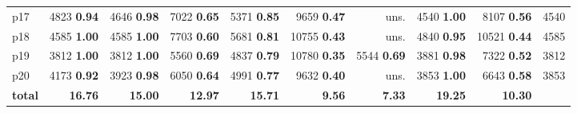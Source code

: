 \begin{tabular}{|l|rrrrrrrr|r|}
p17 & {\footnotesize 4823} \textbf{0.94} & {\footnotesize 4646} \textbf{0.98} & {\footnotesize 7022} \textbf{0.65} & {\footnotesize 5371} \textbf{0.85} & {\footnotesize 9659} \textbf{0.47} & uns. & {\footnotesize 4540} \textbf{1.00} & {\footnotesize 8107} \textbf{0.56} & 4540\\
p18 & {\footnotesize 4585} \textbf{1.00} & {\footnotesize 4585} \textbf{1.00} & {\footnotesize 7703} \textbf{0.60} & {\footnotesize 5681} \textbf{0.81} & {\footnotesize 10755} \textbf{0.43} & uns. & {\footnotesize 4840} \textbf{0.95} & {\footnotesize 10521} \textbf{0.44} & 4585\\
p19 & {\footnotesize 3812} \textbf{1.00} & {\footnotesize 3812} \textbf{1.00} & {\footnotesize 5560} \textbf{0.69} & {\footnotesize 4837} \textbf{0.79} & {\footnotesize 10780} \textbf{0.35} & {\footnotesize 5544} \textbf{0.69} & {\footnotesize 3881} \textbf{0.98} & {\footnotesize 7322} \textbf{0.52} & 3812\\
p20 & {\footnotesize 4173} \textbf{0.92} & {\footnotesize 3923} \textbf{0.98} & {\footnotesize 6050} \textbf{0.64} & {\footnotesize 4991} \textbf{0.77} & {\footnotesize 9632} \textbf{0.40} & uns. & {\footnotesize 3853} \textbf{1.00} & {\footnotesize 6643} \textbf{0.58} & 3853\\
\hline
\textbf{total} & \textbf{16.76} & \textbf{15.00} & \textbf{12.97} & \textbf{15.71} & \textbf{9.56} & \textbf{7.33} & \textbf{19.25} & \textbf{10.30} & \\
\hline
\end{tabular}

